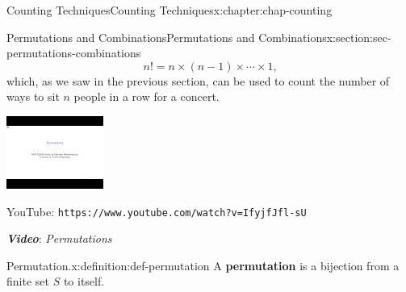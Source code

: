 \documentclass[oneside,10pt,]{book}
\newcommand{\mono}[1]{\texttt{#1}}
\newcommand{\alert}[1]{\textbf{\textit{#1}}}
\newcommand{\terminology}[1]{\textbf{#1}}
\numberwithin{equation}{section}
\newlength{\qrsize}
\newlength{\previewwidth}
\begin{document}
\begin{chapterptx}{Counting Techniques}{}{Counting Techniques}{}{}{x:chapter:chap-counting}
\begin{sectionptx}{Permutations and Combinations}{}{Permutations and Combinations}{}{}{x:section:sec-permutations-combinations}
\begin{equation*}
n! = n \times (n-1) \times \cdots \times 1\text{,}
\end{equation*}
which, as we saw in the previous section, can be used to count the number of ways to sit \(n\) people in a row for a concert.%
\begin{sidebyside}{1}{0}{0}{0}%
\begin{sbspanel}{1}%
\setlength{\qrsize}{9em}
\setlength{\previewwidth}{\linewidth}
\addtolength{\previewwidth}{-\qrsize}
\begin{tcbraster}[raster columns=2, raster column skip=1pt, raster halign=center, raster force size=false, raster left skip=0pt, raster right skip=0pt]%
\begin{tcolorbox}[previewstyle, width=\previewwidth]%
\includegraphics[width=0.80\linewidth,height=\qrsize,keepaspectratio]{images/video-permutation.jpg}%
\end{tcolorbox}%
\begin{tcolorbox}[qrstyle]%
{\hypersetup{urlcolor=black}}%
\end{tcolorbox}%
\begin{tcolorbox}[captionstyle]%
\small YouTube: \mono{https://www.youtube.com/watch?v=IfyjfJfl-sU}\end{tcolorbox}%
\end{tcbraster}%
\end{sbspanel}%
\end{sidebyside}%
\par
\alert{Video}: \emph{Permutations}%
\begin{definition}{Permutation.}{x:definition:def-permutation}%
A \terminology{permutation} is a bijection from a finite set \(S\) to itself.%
\end{definition}

\end{sectionptx}
\end{chapterptx}
\end{document}
